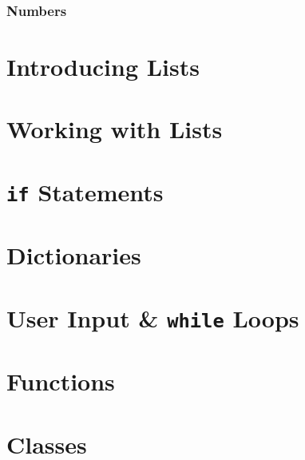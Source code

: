 \documentclass[oneside]{book}
\numberwithin{equation}{section}
\begin{document}
\subsubsection{Numbers}


\section{Introducing Lists}


\section{Working with Lists}


\section{\texttt{if} Statements}


\section{Dictionaries}


\section{User Input \& \texttt{while} Loops}


\section{Functions}


\section{Classes}
\end{document}
